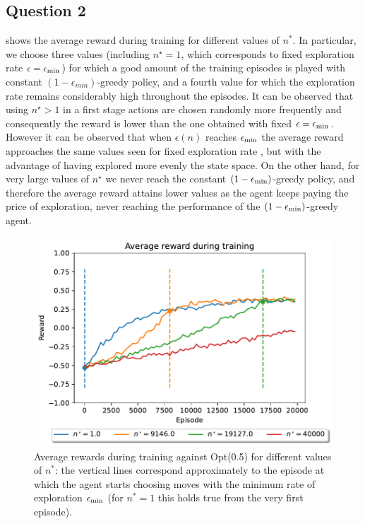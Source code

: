 \documentclass[10pt]{IEEEtran}
\begin{document}
\subsection*{Question 2}
 shows the average reward during training for different values of $n^{*}$. In particular, we choose three values (including $n^{\star} = 1$, which corresponds to fixed exploration rate $\epsilon = \epsilon_{\text{min}}$) for which a good amount of the training episodes is played with constant $(1-\epsilon_{min})$-greedy policy, and a fourth value for which the exploration rate remains considerably high throughout the episodes. It can be observed that using $n^{\star} > 1$ in a first stage actions are chosen randomly more frequently and consequently the reward is lower than the one obtained with fixed $\epsilon = \epsilon_{\text{min}}$. However it can be observed that when $\epsilon(n)$ reaches $\epsilon_{\text{min}}$ the average reward approaches the same values seen for fixed exploration rate , but with the advantage of having explored more evenly the state space. On the other hand, for very large values of $n^{\star}$ we never reach the constant $(1-\epsilon_{\text{min}})$-greedy policy, and therefore the average reward attains lower values as the agent keeps paying the price of exploration, never reaching the performance of the $(1-\epsilon_{\text{min}})$-greedy agent. 


\begin{figure}[h]
    \centering
    \includegraphics[width = 0.85\linewidth]{code/figures/rewards_n_star.pdf}
    \caption{Average rewards during training against Opt(0.5) for different values of $n^{*}$: the vertical lines correspond approximately to the episode at which the agent starts choosing moves with the minimum rate of exploration $\epsilon_{\text{min}}$ (for $n^{*} = 1$ this holds true from the very first episode).}
    \label{plot_question2}
\end{figure}
\end{document}
